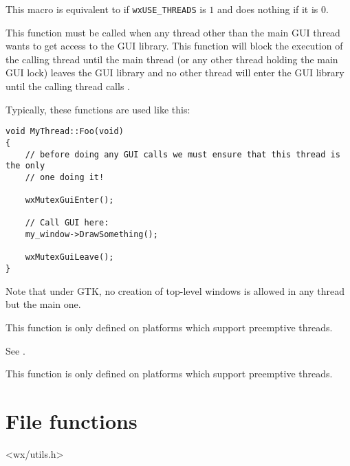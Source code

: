 
This macro is equivalent to  if 
{\tt wxUSE\_THREADS} is $1$ and does nothing if it is $0$.



\label{wxmutexguienter}


This function must be called when any thread other than the main GUI thread
wants to get access to the GUI library. This function will block the execution
of the calling thread until the main thread (or any other thread holding the
main GUI lock) leaves the GUI library and no other thread will enter the GUI
library until the calling thread calls .

Typically, these functions are used like this:

\begin{verbatim}
void MyThread::Foo(void)
{
    // before doing any GUI calls we must ensure that this thread is the only
    // one doing it!

    wxMutexGuiEnter();

    // Call GUI here:
    my_window->DrawSomething();

    wxMutexGuiLeave();
}
\end{verbatim}

Note that under GTK, no creation of top-level windows is allowed in any
thread but the main one.

This function is only defined on platforms which support preemptive
threads.


\label{wxmutexguileave}


See .

This function is only defined on platforms which support preemptive
threads.



\section{File functions}\label{filefunctions}


<wx/utils.h>


